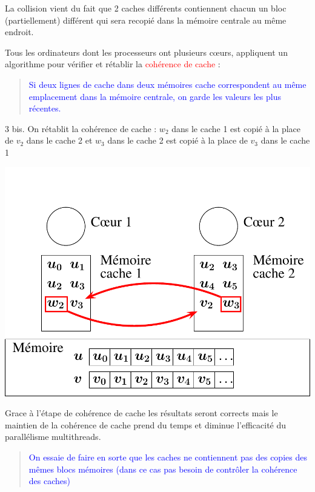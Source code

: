 \documentclass{beamer}
\begin{document}
\begin{frame}
	\vfill
	La collision vient du fait que 2 caches différents contiennent chacun un bloc (partiellement) différent qui sera recopié dans la mémoire centrale au même endroit.
	
	\vfill
	Tous les ordinateurs dont les processeurs ont plusieurs c\oe urs, appliquent un algorithme pour vérifier et rétablir la \textcolor{red}{cohérence de cache} :
	
	\vfill
\begin{quote}
	\textcolor{blue}{Si deux lignes de cache dans deux mémoires cache correspondent au même emplacement dans la mémoire centrale, on garde les valeurs les plus récentes.}
\end{quote}
\vfill

\end{frame}

\begin{frame}
	\parbox[t][1cm]{10cm}{3 bis. On rétablit la cohérence de cache : $w_2$ dans le cache 1 est copié à la place de $v_2$ dans le cache 2 et $w_3$ dans le cache 2 est copié à la place de $v_3$ dans le cache 1}
	\begin{center}
		\includegraphics[scale=0.6]{../../Images/multithread4}
	\end{center}
\end{frame}

\begin{frame}
	Grace à l'étape de cohérence de cache les résultats seront corrects mais le maintien de la cohérence de cache prend du temps et diminue l'efficacité du parallélisme multithreads.
	
	\bigskip
	\begin{quote}
		\textcolor{blue}{On essaie de faire en sorte que les caches ne contiennent pas des copies des mêmes blocs mémoires (dans ce cas pas besoin de contrôler la cohérence des caches)}
	\end{quote}
	
\end{frame}
\end{document}

